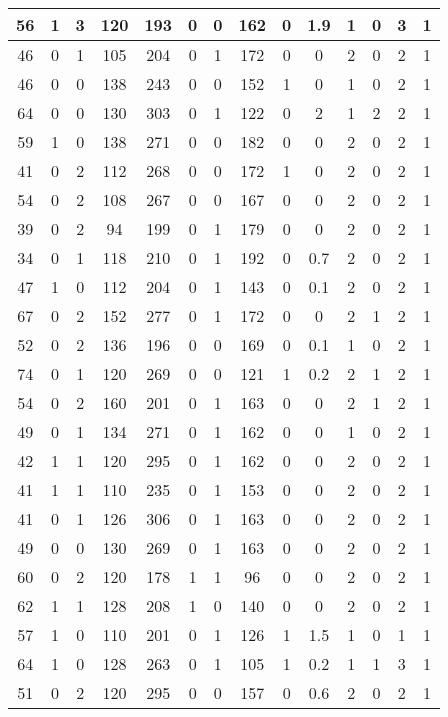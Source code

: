 \documentclass{article}
\begin{document}
\begin{longtable}{|c|c|c|c|c|c|c|c|c|c|c|c|c|c|}
\hline
56 & 1 & 3 & 120 & 193 & 0 & 0 & 162 & 0 & 1.9 & 1 & 0 & 3 & 1\\
\hline
46 & 0 & 1 & 105 & 204 & 0 & 1 & 172 & 0 & 0 & 2 & 0 & 2 & 1\\
\hline
46 & 0 & 0 & 138 & 243 & 0 & 0 & 152 & 1 & 0 & 1 & 0 & 2 & 1\\
\hline
64 & 0 & 0 & 130 & 303 & 0 & 1 & 122 & 0 & 2 & 1 & 2 & 2 & 1\\
\hline
59 & 1 & 0 & 138 & 271 & 0 & 0 & 182 & 0 & 0 & 2 & 0 & 2 & 1\\
\hline
41 & 0 & 2 & 112 & 268 & 0 & 0 & 172 & 1 & 0 & 2 & 0 & 2 & 1\\
\hline
54 & 0 & 2 & 108 & 267 & 0 & 0 & 167 & 0 & 0 & 2 & 0 & 2 & 1\\
\hline
39 & 0 & 2 & 94 & 199 & 0 & 1 & 179 & 0 & 0 & 2 & 0 & 2 & 1\\
\hline
34 & 0 & 1 & 118 & 210 & 0 & 1 & 192 & 0 & 0.7 & 2 & 0 & 2 & 1\\
\hline
47 & 1 & 0 & 112 & 204 & 0 & 1 & 143 & 0 & 0.1 & 2 & 0 & 2 & 1\\
\hline
67 & 0 & 2 & 152 & 277 & 0 & 1 & 172 & 0 & 0 & 2 & 1 & 2 & 1\\
\hline
52 & 0 & 2 & 136 & 196 & 0 & 0 & 169 & 0 & 0.1 & 1 & 0 & 2 & 1\\
\hline
74 & 0 & 1 & 120 & 269 & 0 & 0 & 121 & 1 & 0.2 & 2 & 1 & 2 & 1\\
\hline
54 & 0 & 2 & 160 & 201 & 0 & 1 & 163 & 0 & 0 & 2 & 1 & 2 & 1\\
\hline
49 & 0 & 1 & 134 & 271 & 0 & 1 & 162 & 0 & 0 & 1 & 0 & 2 & 1\\
\hline
42 & 1 & 1 & 120 & 295 & 0 & 1 & 162 & 0 & 0 & 2 & 0 & 2 & 1\\
\hline
41 & 1 & 1 & 110 & 235 & 0 & 1 & 153 & 0 & 0 & 2 & 0 & 2 & 1\\
\hline
41 & 0 & 1 & 126 & 306 & 0 & 1 & 163 & 0 & 0 & 2 & 0 & 2 & 1\\
\hline
49 & 0 & 0 & 130 & 269 & 0 & 1 & 163 & 0 & 0 & 2 & 0 & 2 & 1\\
\hline
60 & 0 & 2 & 120 & 178 & 1 & 1 & 96 & 0 & 0 & 2 & 0 & 2 & 1\\
\hline
62 & 1 & 1 & 128 & 208 & 1 & 0 & 140 & 0 & 0 & 2 & 0 & 2 & 1\\
\hline
57 & 1 & 0 & 110 & 201 & 0 & 1 & 126 & 1 & 1.5 & 1 & 0 & 1 & 1\\
\hline
64 & 1 & 0 & 128 & 263 & 0 & 1 & 105 & 1 & 0.2 & 1 & 1 & 3 & 1\\
\hline
51 & 0 & 2 & 120 & 295 & 0 & 0 & 157 & 0 & 0.6 & 2 & 0 & 2 & 1\\

\end{longtable}
\end{document}
